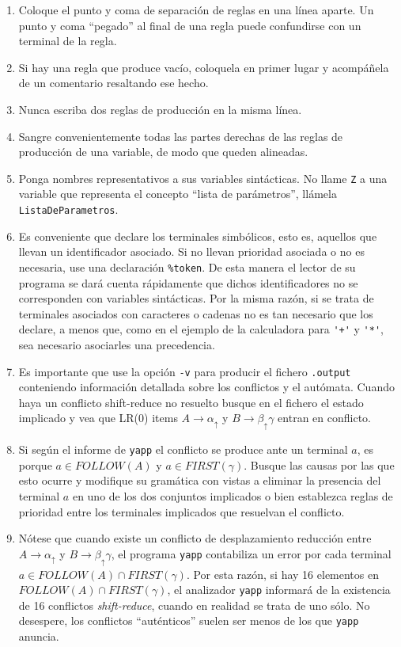\begin{enumerate}
\item
Coloque el punto y coma de separación de reglas en una línea aparte.
Un punto y coma ``pegado'' al final de una regla puede confundirse
con un terminal de la regla.

\item
Si hay una regla que produce vacío, coloquela en primer lugar y acompáñela de 
un comentario resaltando ese hecho.
\item
Nunca escriba dos reglas de producción en la misma línea.
\item
Sangre convenientemente todas las partes derechas de las reglas
de producción de una variable, de modo que queden
alineadas.
\item
Ponga nombres representativos a sus variables sintácticas. No llame 
\verb|Z| a una variable que representa el concepto ``lista de parámetros'',
llámela \verb|ListaDeParametros|.
\item
Es conveniente que declare los terminales simbólicos, esto es, aquellos que 
llevan un identificador asociado. Si no llevan prioridad asociada o no 
es necesaria, use una declaración \verb|%token|. De esta manera
el lector de su programa se dará cuenta rápidamente que dichos identificadores
no se corresponden con variables sintácticas. Por la misma razón,
si se trata de terminales
asociados con caracteres o cadenas no es tan necesario que los declare, 
a menos que, 
como en el ejemplo de la calculadora para \verb|'+'| y \verb|'*'|,
sea necesario asociarles una
precedencia.
\item
Es importante que use la opción \verb|-v| para producir
el fichero \verb|.output| conteniendo información detallada sobre
los conflictos y el autómata. Cuando haya un conflicto shift-reduce
no resuelto busque en el fichero el estado implicado y 
vea que LR(0) items $A \rightarrow \alpha_\uparrow$
y $B \rightarrow \beta_\uparrow \gamma$ entran en conflicto.

\item
\label{item:conflictos}
Si según el informe de \verb|yapp|
el conflicto se produce ante un terminal $a$,
es porque $a \in FOLLOW(A)$ y
$a \in FIRST(\gamma)$. Busque las causas por las que esto ocurre 
y modifique su gramática con vistas a eliminar la presencia
del terminal $a$ en uno de los dos conjuntos implicados
o bien establezca reglas de prioridad entre los terminales
implicados que resuelvan el conflicto.

\item
Nótese que cuando existe un conflicto de desplazamiento 
reducción entre $A \rightarrow \alpha_\uparrow$ 
y  $B \rightarrow \beta_\uparrow \gamma$, el programa
\verb|yapp| contabiliza un error por cada terminal 
$a \in FOLLOW(A) \cap FIRST(\gamma)$. Por esta razón,
si hay 16 elementos en $FOLLOW(A) \cap FIRST(\gamma)$,
el analizador \verb|yapp| informará de la existencia
de 16 conflictos \emph{shift-reduce},
cuando en realidad se trata de uno sólo. No desespere, 
los conflictos ``auténticos'' suelen
ser menos de los que \verb|yapp| anuncia.


\end{enumerate}
